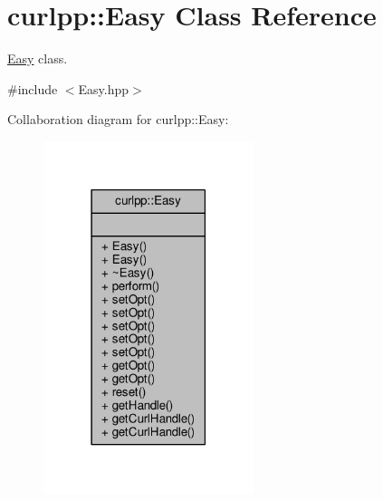 \hypertarget{classcurlpp_1_1Easy}{\section{curlpp\-:\-:Easy Class Reference}
\label{classcurlpp_1_1Easy}
}


\hyperlink{classcurlpp_1_1Easy}{Easy} class.  




{\ttfamily \#include $<$Easy.\-hpp$>$}



Collaboration diagram for curlpp\-:\-:Easy\-:\nopagebreak
\begin{figure}[H]
\begin{center}
\leavevmode
\includegraphics[width=174pt]{classcurlpp_1_1Easy__coll__graph}
\end{center}
\end{figure}
